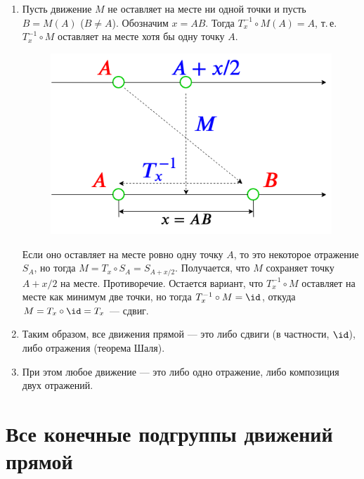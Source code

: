 \begin{enumerate}
\item Пусть движение $M$ не оставляет на месте ни одной точки и пусть $B=M(A)$ ($B\ne A$). Обозначим $x=AB$. Тогда $T_{x}^{-1}\circ M(A)=A$, т.\,е. $T_{x}^{-1}\circ M$ оставляет на месте хотя бы одну точку $A$.
\begin{figure}[hbt!]
\begin{center}
\includegraphics[scale=0.35]{LineMovingx.png}
\end{center}
\caption{}\label{LineMovingx}
\end{figure}

Если оно оставляет на месте ровно одну точку $A$, то это некоторое отражение $S_A$, но тогда $M=T_x\circ S_A=S_{A+x/2}$. Получается, что $M$ сохраняет точку $A+x/2$ на месте. Противоречие. Остается вариант, что $T_{x}^{-1}\circ M$ оставляет на месте как минимум две точки, но тогда $T_{x}^{-1}\circ M=\id$, откуда $M=T_x\circ \id=T_x$ --- сдвиг.
\item Таким образом, все движения прямой --- это либо сдвиги (в частности, $\id$), либо отражения (теорема Шаля).
\item При этом любое движение --- это либо одно отражение, либо композиция двух отражений.
\end{enumerate}



\section{Все конечные подгруппы движений прямой}




